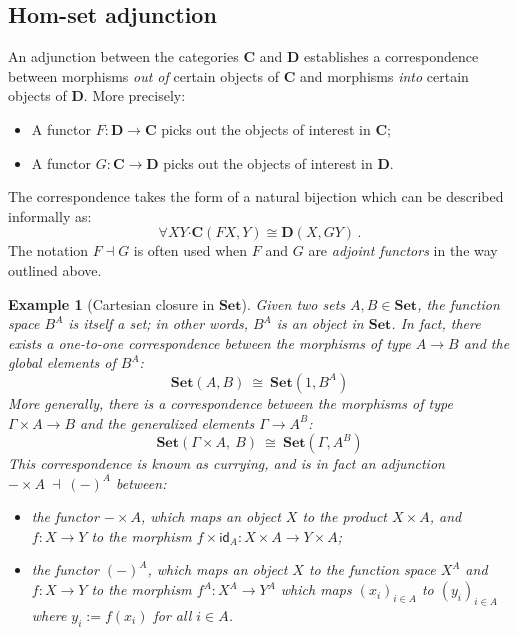 \documentclass[11pt,oneside]{book}
\newtheorem{example}[theorem]{Example}
\theoremstyle{definition}
\newcommand{\kw}[1]{\ensuremath{ \mathsf{#1} }}
\newcommand{\bdot}{\boldsymbol{\cdot}}
\begin{document}

\subsection{Hom-set adjunction} %

An adjunction between the categories $\mathbf{C}$ and $\mathbf{D}$
establishes a correspondence between
morphisms \emph{out of} certain objects of $\mathbf{C}$ and
morphisms \emph{into} certain objects of $\mathbf{D}$.
More precisely:
\begin{itemize}
  \item
    A functor $F : \mathbf{D} \rightarrow \mathbf{C}$
    picks out the objects of interest in $\mathbf{C}$;
  \item
    A functor $G : \mathbf{C} \rightarrow \mathbf{D}$
    picks out the objects of interest in $\mathbf{D}$.
\end{itemize}
The correspondence takes the form of a natural bijection
which can be described informally as:
\[
  \forall X Y \bdot \mathbf{C}(F X, Y) \cong \mathbf{D}(X, G Y)
  \,.
\]
The notation $F \dashv G$ is often used
when $F$ and $G$ are \emph{adjoint functors}
in the way outlined above.


\begin{example}[Cartesian closure in $\mathbf{Set}$] \label{ex:ccset} %
Given two sets $A, B \in \mathbf{Set}$,
the function space $B^A$
is itself a set;
in other words, $B^A$ is an object in $\mathbf{Set}$.
In fact, there exists a one-to-one correspondence
between the morphisms of type $A \rightarrow B$
and the global elements of $B^A$:
\[
  \mathbf{Set}(A, B)
  \: \cong \:
  \mathbf{Set}(1, B^A)
\]
More generally,
there is a correspondence
between the morphisms of type
$\Gamma \times A \rightarrow B$
and the generalized elements
$\Gamma \rightarrow A^B$:
\[
  \mathbf{Set}(\Gamma \times A, \: B)
  \: \cong \:
  \mathbf{Set}(\Gamma, A^B)
\]
This correspondence is known as \emph{currying},
and is in fact
an adjunction
$
  - \times A \: \dashv \: (-)^A
$
between:
\begin{itemize}
  \item the functor ${-} \times A$,
    which maps an object $X$ to the product $X \times A$,
    and $f : X \rightarrow Y$ to the morphism
    $f \times \kw{id}_A : X \times A \rightarrow Y \times A$;
  \item the functor $(-)^A$,
    which maps an object $X$ to the function space $X^A$
    and $f : X \rightarrow Y$ to the morphism
    $f^A : X^A \rightarrow Y^A$
    which maps $(x_i)_{i \in A}$
    to $(y_i)_{i \in A}$
    where $y_i := f(x_i)$ for all $i \in A$.
\end{itemize}
\end{example}
\end{document}
